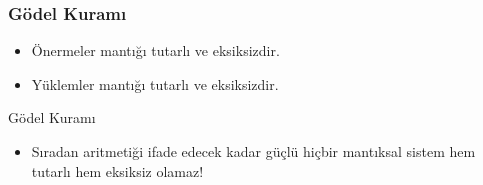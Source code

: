 \documentclass[dvipsnames]{beamer}
\theoremstyle{definition}
\theoremstyle{example}
\newtheorem{ornek}[theorem]{Örnek}
\theoremstyle{plain}
\begin{document}
\begin{frame}
  \frametitle{Gödel Kuramı}

  \begin{itemize}
    \item Önermeler mantığı tutarlı ve eksiksizdir.
    \item Yüklemler mantığı tutarlı ve eksiksizdir.
  \end{itemize}

  \pause
  \begin{block}{Gödel Kuramı}
    \begin{itemize}
      \item Sıradan aritmetiği ifade edecek kadar güçlü hiçbir mantıksal sistem
        hem tutarlı hem eksiksiz olamaz!
    \end{itemize}
  \end{block}
\end{frame}
%
%
%
%
%
%
%
%
\end{document}

